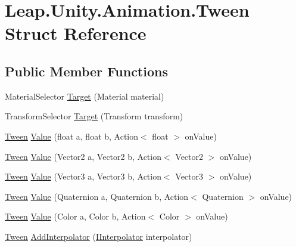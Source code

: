 \hypertarget{struct_leap_1_1_unity_1_1_animation_1_1_tween}{}\section{Leap.\+Unity.\+Animation.\+Tween Struct Reference}
\label{struct_leap_1_1_unity_1_1_animation_1_1_tween}
\subsection*{Public Member Functions}
\begin{DoxyCompactItemize}
\item 
Material\+Selector \mbox{\hyperlink{struct_leap_1_1_unity_1_1_animation_1_1_tween_ace36e93470c4b1168289ae1eef2e4736}{Target}} (Material material)
\item 
Transform\+Selector \mbox{\hyperlink{struct_leap_1_1_unity_1_1_animation_1_1_tween_aa7b22a26af26ea28523475885b119dda}{Target}} (Transform transform)
\item 
\mbox{\hyperlink{struct_leap_1_1_unity_1_1_animation_1_1_tween}{Tween}} \mbox{\hyperlink{struct_leap_1_1_unity_1_1_animation_1_1_tween_a831691155a74d63fe5a0a8c07bce6d13}{Value}} (float a, float b, Action$<$ float $>$ on\+Value)
\item 
\mbox{\hyperlink{struct_leap_1_1_unity_1_1_animation_1_1_tween}{Tween}} \mbox{\hyperlink{struct_leap_1_1_unity_1_1_animation_1_1_tween_a4b8b8872079eed40ed3565488390768b}{Value}} (Vector2 a, Vector2 b, Action$<$ Vector2 $>$ on\+Value)
\item 
\mbox{\hyperlink{struct_leap_1_1_unity_1_1_animation_1_1_tween}{Tween}} \mbox{\hyperlink{struct_leap_1_1_unity_1_1_animation_1_1_tween_ad8eaac902159cb11727ed3fdb9b29f8a}{Value}} (Vector3 a, Vector3 b, Action$<$ Vector3 $>$ on\+Value)
\item 
\mbox{\hyperlink{struct_leap_1_1_unity_1_1_animation_1_1_tween}{Tween}} \mbox{\hyperlink{struct_leap_1_1_unity_1_1_animation_1_1_tween_a4877dc9c6bc0010523f51d21549098fa}{Value}} (Quaternion a, Quaternion b, Action$<$ Quaternion $>$ on\+Value)
\item 
\mbox{\hyperlink{struct_leap_1_1_unity_1_1_animation_1_1_tween}{Tween}} \mbox{\hyperlink{struct_leap_1_1_unity_1_1_animation_1_1_tween_aab3b83bfba4ff98c4ddb8129501e731b}{Value}} (Color a, Color b, Action$<$ Color $>$ on\+Value)
\item 
\mbox{\hyperlink{struct_leap_1_1_unity_1_1_animation_1_1_tween}{Tween}} \mbox{\hyperlink{struct_leap_1_1_unity_1_1_animation_1_1_tween_a4003f15c23a01d48cc1c2b5ecf48373c}{Add\+Interpolator}} (\mbox{\hyperlink{interface_leap_1_1_unity_1_1_animation_1_1_i_interpolator}{I\+Interpolator}} interpolator)

\end{DoxyCompactItemize}
